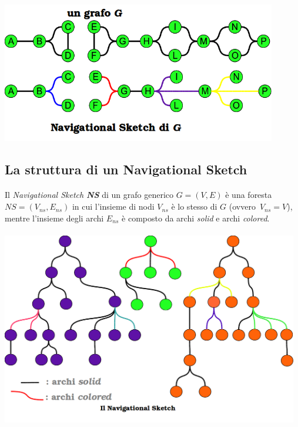 \documentclass[a4paper,11pt]{report}
\begin{document}
\paragraph{}
\centerline{\includegraphics[width=120mm]{images/da_grafo_a_NS.png}}
\subsection{La struttura di un Navigational Sketch}
\paragraph{}
Il \emph{Navigational Sketch} \emph{\textbf{NS}} di un grafo generico \mbox{$G=(V,E)$} è una foresta \mbox{$NS=(V_{ns},E_{ns})$} in cui
l'insieme di nodi $V_{ns}$ è lo stesso
 di $G$ (ovvero\mbox{ $V_{ns}=V$}),
mentre l'insieme degli archi $E_{ns}$ è composto da archi \emph{solid} e archi \emph{colored}.
\paragraph{}\paragraph{}
\centerline{\includegraphics[width=130mm]{images/navigational-sketch_notit.png}}
\end{document}
